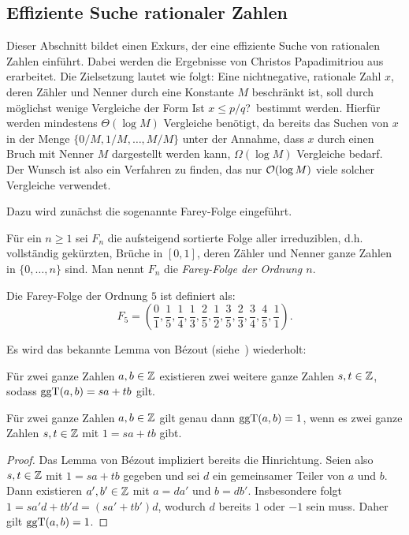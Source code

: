\subsection{Effiziente Suche rationaler Zahlen}\label{sec-rational-search}

Dieser Abschnitt bildet einen Exkurs, der eine effiziente Suche von rationalen Zahlen einführt.
Dabei werden die Ergebnisse von Christos Papadimitriou aus~\cite{Papadimitriou1979} erarbeitet.
Die Zielsetzung lautet wie folgt:
Eine nichtnegative, rationale Zahl $x$, deren Zähler und Nenner durch eine Konstante $M$ beschränkt ist, soll durch möglichst wenige Vergleiche der Form \glqq Ist $x\leq p/q$?\grqq\ bestimmt werden.
Hierfür werden mindestens $\Theta(\log M)$ Vergleiche benötigt, da bereits das Suchen von $x$ in der Menge $\{ 0/M, 1/M, \dots, M/M \}$ unter der Annahme, dass $x$ durch einen Bruch mit Nenner $M$ dargestellt werden kann, $\Omega(\log M)$ Vergleiche bedarf.
Der Wunsch ist also ein Verfahren zu finden, das nur $\mathcal{O}(\log M)$ viele solcher Vergleiche verwendet.

Dazu wird zunächst die sogenannte Farey-Folge eingeführt.

\begin{definition}
	Für ein $n\geq 1$ sei $F_n$ die aufsteigend sortierte Folge aller irreduziblen, d.h. vollständig gekürzten, Brüche in $[0,1]$, deren Zähler und Nenner ganze Zahlen in $\{0, \dots, n\}$ sind.
	Man nennt $F_n$ die \emph{Farey-Folge der Ordnung $n$}.
\end{definition}

\begin{example}
	Die Farey-Folge der Ordnung $5$ ist definiert als:
	\[
		F_5 = \left( \frac{0}{1}, \frac{1}{5}, \frac{1}{4}, \frac{1}{3}, \frac{2}{5}, \frac{1}{2}, \frac{3}{5}, \frac{2}{3}, \frac{3}{4}, \frac{4}{5}, \frac{1}{1} \right).
	\]
\end{example}

Es wird das bekannte Lemma von Bézout (siehe~\cite[Satz 3.5]{Algebra2008}) wiederholt:
\begin{lemma}\label{lemma-von-bezout}
	Für zwei ganze Zahlen $a, b\in\mathbb{Z}$ existieren zwei weitere ganze Zahlen $s,t\in\mathbb{Z}$, sodass $\operatorname{ggT}(a,b) = sa + tb$ gilt.
\end{lemma}

\begin{corollary}\label{cor-bezout-reverted}
	Für zwei ganze Zahlen $a,b\in\mathbb{Z}$ gilt genau dann $\operatorname{ggT}(a,b) = 1$, wenn es zwei ganze Zahlen $s,t\in\mathbb{Z}$ mit $1 = sa + tb$ gibt.
\end{corollary}
\begin{proof}
	Das Lemma von Bézout impliziert bereits die Hinrichtung.
	Seien also $s,t\in\mathbb{Z}$ mit $1= sa +tb$ gegeben und sei $d$ ein gemeinsamer Teiler von $a$ und $b$.
	Dann existieren $a',b'\in\mathbb{Z}$ mit $a=d a'$ und $b=d b'$.
	Insbesondere folgt $1 = sa'd + tb'd = (sa' + tb') d$, wodurch $d$ bereits $1$ oder $-1$ sein muss.
	Daher gilt $\operatorname{ggT}(a,b)=1$.
\end{proof}

